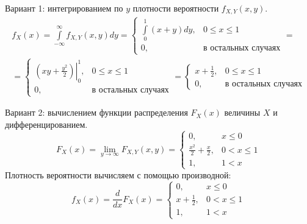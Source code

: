\documentclass[12pt,a4paper]{article}
\begin{document}
\begin{enumerate}
        Вариант 1: интегрированием по $y$ плотности вероятности $f_{X,Y}(x,y)$.
        \begin{multline}
            f_X(x)
            = \int \limits_{-\infty}^{\infty} f_{X,Y}(x,y) dy
            =
            \left \{
            \begin{array}{ll}
                \int \limits_0^1 (x + y) dy, & 0 \le x \le 1              \\
                0,                           & \text{в остальных случаях}
            \end{array}
            \right . = \\
%
            =
            \left \{
            \begin{array}{ll}
                \left . \left ( x y + \frac{y^2}{2} \right ) \right |_0^1, & 0 \le x \le 1              \\
                0,                                                         & \text{в остальных случаях}
            \end{array}
            \right .
            =
            \left \{
            \begin{array}{ll}
                x + \frac{1}{2}, & 0 \le x \le 1              \\
                0,               & \text{в остальных случаях}
            \end{array}
            \right .
        \end{multline}

        Вариант 2: вычислением функции распределения $F_X(x)$ величины $X$ и дифференцированием.
        \begin{equation}
            F_X(x)
            = \lim_{y \rightarrow \infty} F_{X,Y}(x,y)
            = \left \{
            \begin{array}{ll}
                0,                           & x \le 0     \\
                \frac{x^2}{2} + \frac{x}{2}, & 0 < x \le 1 \\
                1,                           & 1 < x
            \end{array}
            \right .
        \end{equation}
        Плотность вероятности вычисляем с помощью производной:
        \begin{equation}
            f_X(x)
            = \frac{d}{dx} F_X(x)
            = \left \{
            \begin{array}{ll}
                0,               & x \le 0     \\
                x + \frac{1}{2}, & 0 < x \le 1 \\
                1,               & 1 < x
            \end{array}
            \right .
        \end{equation}


\end{enumerate}
\end{document}
